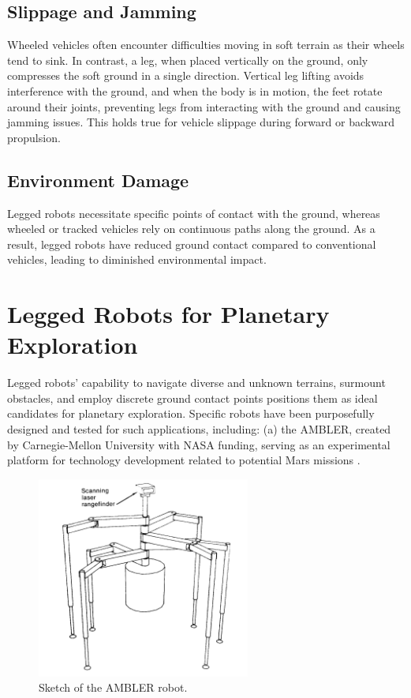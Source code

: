\subsection{Slippage and Jamming}
Wheeled vehicles often encounter difficulties moving in soft terrain as their wheels tend to sink. In contrast, a leg, when placed vertically on the ground, only compresses the soft ground in a single direction. Vertical leg lifting avoids interference with the ground, and when the body is in motion, the feet rotate around their joints, preventing legs from interacting with the ground and causing jamming issues. This holds true for vehicle slippage during forward or backward propulsion.

\subsection{Environment Damage}
Legged robots necessitate specific points of contact with the ground, whereas wheeled or tracked vehicles rely on continuous paths along the ground. As a result, legged robots have reduced ground contact compared to conventional vehicles, leading to diminished environmental impact.


\section{Legged Robots for Planetary Exploration}
Legged robots' capability to navigate diverse and unknown terrains, surmount obstacles, and employ discrete ground contact points positions them as ideal candidates for planetary exploration. Specific robots have been purposefully designed and tested for such applications, including: (a) the AMBLER, created by Carnegie-Mellon University with NASA funding, serving as an experimental platform for technology development related to potential Mars missions \cite{bares}.\\

\begin{figure}[h]
  \centering
  \includegraphics[width=70mm]{./fig/intro/ambler.png}
  \vspace{2mm}
  \caption{Sketch of the AMBLER robot. \cite{bares}}\label{fig ambler}
\end{figure}

